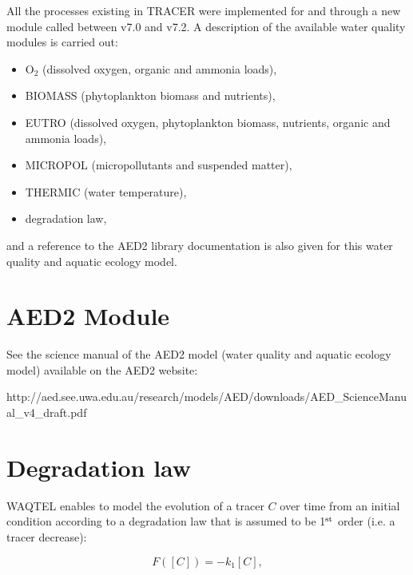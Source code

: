 \documentclass[Waqtel]{../../data/TelemacDoc} %
\begin{document}
All the processes existing in TRACER were implemented for  and  through
a new module called \waqtel between v7.0 and v7.2.
A description of the available water quality modules is carried out:
\begin{itemize}
\item O$_2$ (dissolved oxygen, organic and ammonia loads),
\item BIOMASS (phytoplankton biomass and nutrients),
\item EUTRO (dissolved oxygen, phytoplankton biomass, nutrients, organic and ammonia loads),
\item MICROPOL (micropollutants and suspended matter),
\item THERMIC (water temperature),
\item degradation law,
\end{itemize}
and a reference to the AED2 library documentation is also given
for this water quality and aquatic ecology model.

\newpage














\chapter{AED2 Module}

See the science manual of the AED2 model (water quality and aquatic ecology model)
available on the AED2 website:

http://aed.see.uwa.edu.au/research/models/AED/downloads/AED\_ScienceManual\_v4\_draft.pdf


\chapter{Degradation law}

WAQTEL enables to model the evolution of a tracer $C$ over time from an initial condition
according to a degradation law that is assumed to be 1$^{\rm{st}}$ order (i.e. a tracer decrease):

\begin{equation}
  F([C]) = -k_1 [C],
\end{equation}
\end{document}
